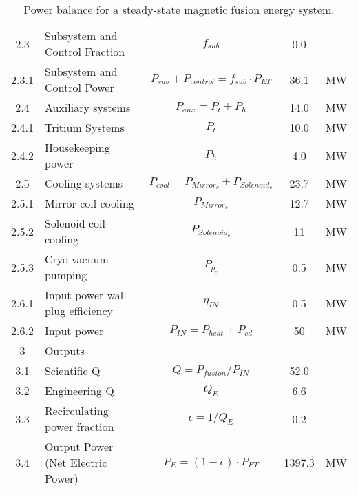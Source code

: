 \begin{table}[ht!]
\begin{tabular}{|c|p{5cm}|c|c|c|}
2.3	&	Subsystem and Control Fraction	&	$f_{{sub}}$	&	0.0	&	\\
2.3.1	&	Subsystem and Control Power	&	$P_{{sub}} + P_{{control}} = f_{{sub}} \cdot P_{{ET}}$	&	36.1	&	MW \\
2.4	&	Auxiliary systems	&	$P_{{aux}} = P_{{t}} + P_{{h}}$	&	14.0	&	MW \\
2.4.1	&	Tritium Systems	&	$P_{{t}}$	&	10.0	&	MW \\
2.4.2	&	Housekeeping power	&	$P_{{h}}$	&	4.0	&	MW \\
2.5	&	Cooling systems	&	$P_{{cool}} = P_{{Mirror}_c} + P_{{Solenoid}_c}$	&	23.7	&	MW \\
2.5.1	&	Mirror coil cooling	&	$P_{{Mirror}_c}$	&	12.7	&	MW \\
2.5.2	&	Solenoid coil cooling	&	$P_{{Solenoid}_c}$	&	11	&	MW \\
2.5.3	&	Cryo vacuum pumping	&	$P_{{p}_c}$	&	0.5	&	MW \\
2.6.1	& Input power wall plug efficiency &	$\eta_{IN}$ & 0.5	&	MW \\
2.6.2	& Input power	& $P_{IN} = P_{heat} + P_{cd}$	&	50	&	MW \\
\hline								
3	&	Outputs	&		&		&	\\
\hline
3.1	&	Scientific Q	&	$Q = P_{{fusion}}/P_{{IN}}$	&	52.0	&	\\
3.2	&	Engineering Q	&	$Q_{{E}}$	&	6.6	&	\\
3.3	&	Recirculating power fraction	&	$\epsilon = 1/Q_{{E}}$	&	0.2	&	\\
3.4	&	Output Power (Net Electric Power)	&	$P_{{E}} = (1 - \epsilon) \cdot P_{{ET}}$	&	1397.3	&	MW \\
\hline								
\end{tabular}	
\caption{Power balance for a steady-state magnetic fusion energy system.}
\label{tab:powerbalance}
\end{table}



